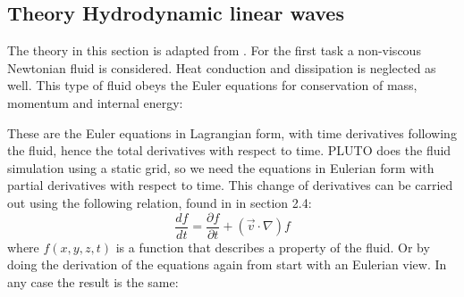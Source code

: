 \subsection{Theory Hydrodynamic linear waves}
The theory in this section is adapted from \cite{notes-fluid-dynamics}. For the first task a non-viscous Newtonian fluid is considered. Heat conduction and dissipation is neglected as well.
This type of fluid obeys the Euler equations for conservation of mass, momentum and internal energy:

{\centering
\noindent {}\par}

These are the Euler equations in Lagrangian form, with time derivatives following the fluid, hence the total derivatives with respect to time.
PLUTO does the fluid simulation using a static grid, so we need the equations in Eulerian form with partial derivatives with respect to time.
This change of derivatives can be carried out using the following relation, found in \cite{notes-fluid-dynamics} in section 2.4:
\begin{equation}
	\frac{df}{dt} = \frac{\partial f}{\partial t} + (\vec{v} \cdot \nabla) f
	\label{eq:relation-total-partial}
\end{equation}
where $f(x,y,z,t)$ is a function that describes a property of the fluid. Or by doing the derivation of the equations again from start with an Eulerian view. In any case the result is the same:

{\centering 
\noindent {}
\par}

